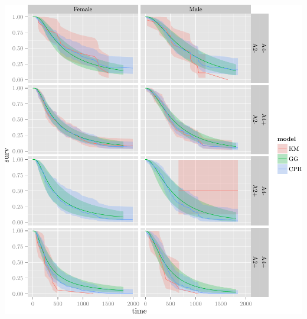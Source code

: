 \documentclass{article}\usepackage[]{graphicx}\usepackage[]{color}
\makeatletter
\def\maxwidth{ %
  \ifdim\Gin@nat@width>\linewidth
    \linewidth
  \else
    \Gin@nat@width
  \fi
}
\newenvironment{knitrout}{}{} %
\makeatother
\begin{document}
\begin{knitrout}
{\centering \includegraphics[width=\maxwidth]{figure/05-final-fit-assessment-2} 

}



\end{knitrout}
\end{document}
